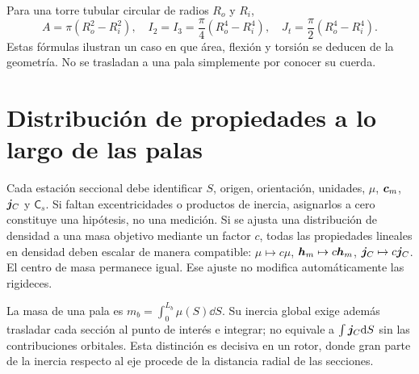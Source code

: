 Para una torre tubular circular de radios $R_o$ y $R_i$,
\begin{equation}
 A=\pi(R_o^2-R_i^2),\quad I_2=I_3=\frac\pi4(R_o^4-R_i^4),\quad
 J_t=\frac\pi2(R_o^4-R_i^4).
\end{equation}
Estas fórmulas ilustran un caso en que área, flexión y torsión se deducen de la geometría. No se trasladan a una pala simplemente por conocer su cuerda.

\section{Distribución de propiedades a lo largo de las palas}
Cada estación seccional debe identificar $S$, origen, orientación, unidades, $\mu$, $\bm{c}_m$, $\boldsymbol{j}_C$ y $\mathsf C_s$. Si faltan excentricidades o productos de inercia, asignarlos a cero constituye una hipótesis, no una medición. Si se ajusta una distribución de densidad a una masa objetivo mediante un factor $c$, todas las propiedades lineales en densidad deben escalar de manera compatible: $\mu\mapsto c\mu$, $\bm{h}_m\mapsto c\bm{h}_m$, $\boldsymbol{j}_C\mapsto c\boldsymbol{j}_C$. El centro de masa permanece igual. Ese ajuste no modifica automáticamente las rigideces.

La masa de una pala es $m_b=\int_0^{L_b}\mu(S)\dd S$. Su inercia global exige además trasladar cada sección al punto de interés e integrar; no equivale a $\int\boldsymbol{j}_C\mathrm d S$ sin las contribuciones orbitales. Esta distinción es decisiva en un rotor, donde gran parte de la inercia respecto al eje procede de la distancia radial de las secciones.
